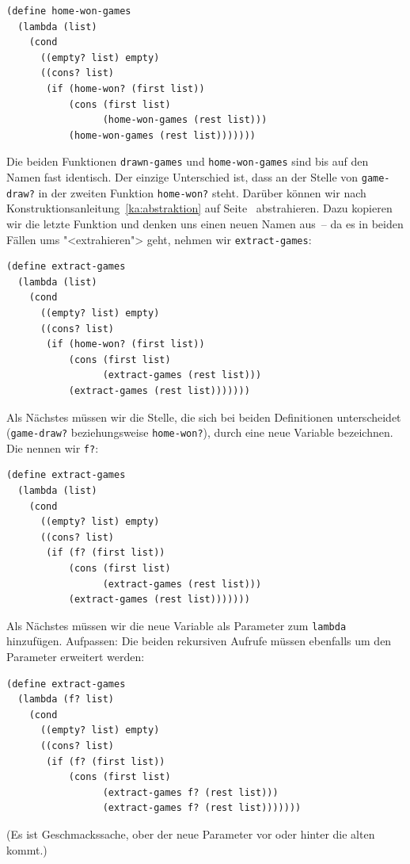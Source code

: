 \begin{lstlisting}
(define home-won-games
  (lambda (list)
    (cond
      ((empty? list) empty)
      ((cons? list)
       (if (home-won? (first list))
           (cons (first list)
                 (home-won-games (rest list)))
           (home-won-games (rest list)))))))
\end{lstlisting}
%
Die beiden Funktionen \lstinline{drawn-games} und
\lstinline{home-won-games} sind bis auf den Namen fast identisch.  Der
einzige Unterschied ist, dass an der Stelle von \lstinline{game-draw?}
in der zweiten Funktion \lstinline{home-won?} steht.  Darüber können
wir nach Konstruktionsanleitung~\ref{ka:abstraktion} auf
Seite~\pageref{ka:abstraktion} abstrahieren.  Dazu kopieren wir die
letzte Funktion und denken uns einen neuen Namen aus~-- da es in
beiden Fällen ums "<extrahieren"> geht, nehmen wir
\lstinline{extract-games}:
%
\begin{lstlisting}
(define extract-games
  (lambda (list)
    (cond
      ((empty? list) empty)
      ((cons? list)
       (if (home-won? (first list))
           (cons (first list)
                 (extract-games (rest list)))
           (extract-games (rest list)))))))
\end{lstlisting}
%
Als Nächstes müssen wir die Stelle, die sich bei beiden Definitionen
unterscheidet (\lstinline{game-draw?} beziehungsweise
\lstinline{home-won?}), durch eine neue Variable bezeichnen.  Die nennen wir
\lstinline{f?}:
%
\begin{lstlisting}
(define extract-games
  (lambda (list)
    (cond
      ((empty? list) empty)
      ((cons? list)
       (if (f? (first list))
           (cons (first list)
                 (extract-games (rest list)))
           (extract-games (rest list)))))))
\end{lstlisting}
%
Als Nächstes müssen wir die neue Variable als Parameter zum
\lstinline{lambda} hinzufügen.  Aufpassen: Die beiden rekursiven
Aufrufe müssen ebenfalls um den Parameter erweitert werden:
%
\begin{lstlisting}
(define extract-games
  (lambda (f? list)
    (cond
      ((empty? list) empty)
      ((cons? list)
       (if (f? (first list))
           (cons (first list)
                 (extract-games f? (rest list)))
                 (extract-games f? (rest list)))))))
\end{lstlisting}
%
(Es ist Geschmackssache, ober der neue Parameter vor oder hinter die
alten kommt.)

